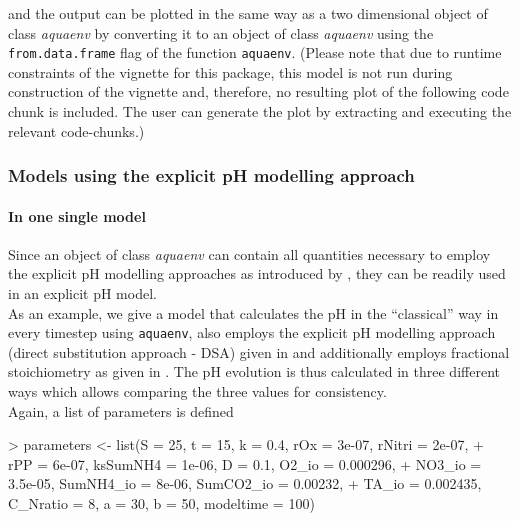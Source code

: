 \documentclass[article,nojss]{jss}
\begin{document}
and the output can be plotted in the same way as a two dimensional object of class \textit{aquaenv} by converting it 
to an object of class \textit{aquaenv} using the \texttt{from.data.frame} flag of the function \texttt{aquaenv}.
(Please note that due to runtime constraints of the vignette for this package, this model is not run during construction of the vignette 
and, therefore, no resulting plot of the following code chunk is included. The user can generate the plot by extracting and executing the relevant code-chunks.)

\begin{Schunk}
\end{Schunk}




\subsubsection{Models using the explicit pH modelling approach}

\paragraph{In one single model} $\;$\\

Since an object of class \textit{aquaenv} can contain all quantities necessary to employ the explicit pH modelling approaches as introduced by 
\cite{Hofmann2008, Hofmann2009, Hofmann2008c}, they can be readily used in an explicit pH model.\\

\noindent
As an example, we give a model that calculates the pH in the ``classical'' way in every timestep using \texttt{aquaenv}, also employs the explicit pH modelling 
approach (direct substitution approach - DSA) given in \cite{Hofmann2008} and additionally employs fractional stoichiometry as given in \cite{Hofmann2008c}.
The pH evolution is thus calculated in three different ways which allows comparing the three values for consistency.\\

\noindent
Again, a list of parameters is defined
\begin{scriptsize}
\begin{Schunk}
\begin{Sinput}
> parameters <- list(S = 25, t = 15, k = 0.4, rOx = 3e-07, rNitri = 2e-07, 
+     rPP = 6e-07, ksSumNH4 = 1e-06, D = 0.1, O2_io = 0.000296, 
+     NO3_io = 3.5e-05, SumNH4_io = 8e-06, SumCO2_io = 0.00232, 
+     TA_io = 0.002435, C_Nratio = 8, a = 30, b = 50, modeltime = 100)
\end{Sinput}
\end{Schunk}
\end{scriptsize}
\end{document}

